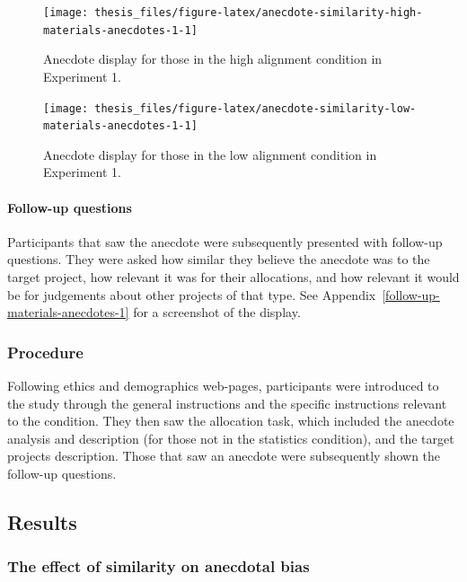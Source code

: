 \documentclass[a4paper, nobind, dvipsnames]{templates/ociamthesis}
\theoremstyle{definition}
\theoremstyle{definition}
\theoremstyle{definition}
\theoremstyle{definition}
\theoremstyle{remark}
\begin{document}
\begin{figure}
\texttt{[image: thesis\_files/figure-latex/anecdote-similarity-high-materials-anecdotes-1-1]} \caption{Anecdote display for those in the high alignment condition in Experiment 1.}\label{fig:anecdote-similarity-high-materials-anecdotes-1}
\end{figure}



\begin{figure}
\texttt{[image: thesis\_files/figure-latex/anecdote-similarity-low-materials-anecdotes-1-1]} \caption{Anecdote display for those in the low alignment condition in Experiment 1.}\label{fig:anecdote-similarity-low-materials-anecdotes-1}
\end{figure}

\hypertarget{follow-up-questions}{%
\paragraph{Follow-up questions}\label{follow-up-questions}}

Participants that saw the anecdote were subsequently presented with follow-up
questions. They were asked how similar they believe the anecdote was to the
target project, how relevant it was for their allocations, and how relevant it
would be for judgements about other projects of that type. See
Appendix~\ref{follow-up-materials-anecdotes-1} for a screenshot of the display.

\hypertarget{procedure-3}{%
\subsubsection{Procedure}\label{procedure-3}}

Following ethics and demographics web-pages, participants were introduced to the
study through the general instructions and the specific instructions relevant to
the condition. They then saw the allocation task, which included the anecdote
analysis and description (for those not in the statistics condition), and the target
projects description. Those that saw an anecdote were subsequently shown the
follow-up questions.

\hypertarget{results-anecdotes-1}{%
\subsection{Results}\label{results-anecdotes-1}}

\hypertarget{the-effect-of-similarity-on-anecdotal-bias}{%
\subsubsection{The effect of similarity on anecdotal bias}\label{the-effect-of-similarity-on-anecdotal-bias}}
\end{document}
